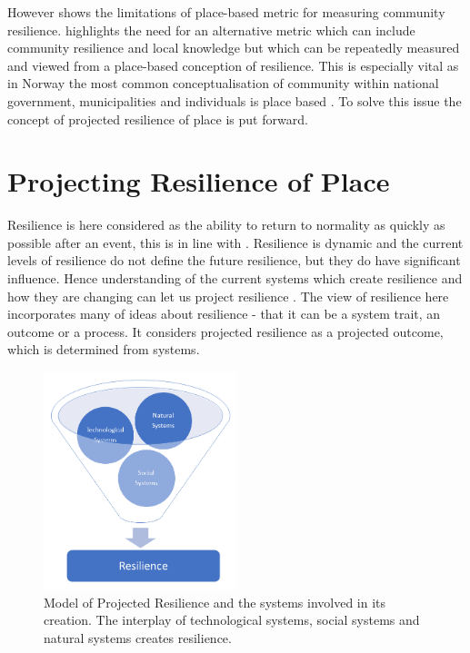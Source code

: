 However \cite{rasanen_conceptualizing_2020} shows the limitations of place-based metric for measuring community resilience. \cite{rasanen_conceptualizing_2020} highlights the need for an alternative metric which can include community resilience and local knowledge but which can be repeatedly measured and viewed from a place-based conception of resilience. This is especially vital as in Norway the most common conceptualisation of community within national government, municipalities and individuals is place based \cite{rasanen_conceptualizing_2020}. To solve this issue the concept of projected resilience of place is put forward. 




\section{Projecting Resilience of Place} 
Resilience is here considered as the ability to return to normality as quickly as possible after an event, this is in line with \cite{cutter_place-based_2008}. Resilience is dynamic and the current levels of resilience do not define the future resilience, but they do have significant influence. Hence understanding of the current systems which create resilience and how they are changing can let us project resilience \cite{cutter_community_2020}. The view of resilience here incorporates many of \cite{moser_turbulent_2019} ideas about resilience -  that it can be a system trait, an outcome or a process. It considers projected resilience as a projected outcome, which is determined from systems. 

\begin{figure}[h!]
    \centering
    \includegraphics[width=0.5\textwidth]{fig_theory/resilience model .png}
    \caption{Model of Projected Resilience and the systems involved in its creation. The interplay of technological systems, social systems and natural systems creates resilience. }
    \label{fig:projected_resilience}
\end{figure}

